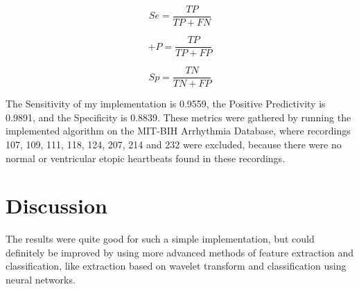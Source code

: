 \documentclass[9pt]{IEEEtran}
\begin{document}
\begin{equation} \label{eq4}
Se =  \dfrac{TP}{TP + FN} 
 \end{equation}

\begin{equation} \label{eq5}
+P =  \dfrac{TP}{TP +FP} 
 \end{equation}

\begin{equation} \label{eq6}
Sp =  \dfrac{TN}{TN +FP} 
 \end{equation}
 
The Sensitivity of my implementation is 0.9559, the Positive Predictivity is  0.9891, and the Specificity is 0.8839. These metrics were gathered by running the implemented algorithm on the MIT-BIH Arrhythmia Database, where recordings 107, 109, 111, 118, 124, 207, 214 and 232 were excluded, because there were no normal or ventricular etopic heartbeats found in these recordings.

\section{Discussion}

The results were quite good for such a simple implementation, but could definitely be improved by using more advanced methods of feature extraction and classification, like extraction based on wavelet transform and classification using neural networks.



\end{document}
